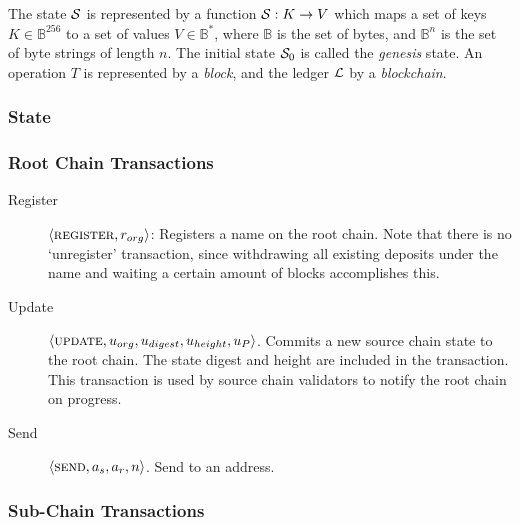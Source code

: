 The state $\mathcal{S}$ is represented by a function $\mathcal{S} : K \to V$ which maps a
set of keys $K \in \mathbb{B}^{256}$ to a set of values $V \in \mathbb{B}^{*}$,
where $\mathbb{B}$ is the set of bytes, and $\mathbb{B}^n$ is the set of byte
strings of length $n$. The initial state $\mathcal{S}_0$ is called the
\emph{genesis} state. An operation $T$ is represented by a \emph{block}, and
the ledger $\mathcal{L}$ by a \emph{blockchain}.

\subsubsection{State}


\subsubsection{Root Chain Transactions}

\begin{description}
    \item[Register] $\langle \text{\normalfont\scshape register}, r_{org} \rangle$: Registers a
        name on the root chain. Note that there is no `unregister'
        transaction, since withdrawing all existing deposits under the name and
        waiting a certain amount of blocks accomplishes this.
    \item[Update] $\langle \text{\normalfont\scshape update}, u_{org}, u_{digest}, u_{height}, u_{P} \rangle$. Commits
        a new source chain state to the root chain. The state digest and height
        are included in the transaction. This transaction is used by source
        chain validators to notify the root chain on progress.
    \item[Send] $\langle \text{\normalfont\scshape send}, a_s, a_r, n \rangle$. Send \oscoin{} to an address.
\end{description}

\subsubsection{Sub-Chain Transactions} \label{source-chain-transactions}

